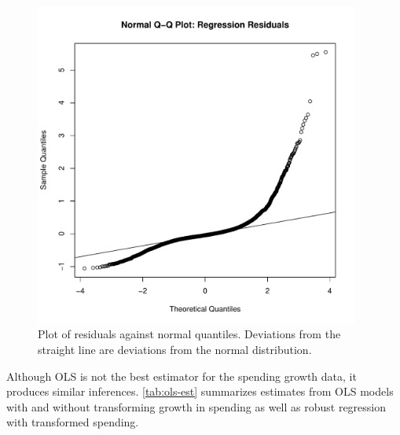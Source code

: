 \documentclass[12pt]{article}
\begin{document}
\begin{figure}[htbp]
	\centering
		\includegraphics[width=0.95\textwidth]{res-qq-plot.pdf}
	\caption{Plot of residuals against normal quantiles. Deviations from the straight line are deviations from the normal distribution.}
	\label{fig:res-qq-plot}
\end{figure}



Although OLS is not the best estimator for the spending growth data, it produces similar inferences.
\autoref{tab:ols-est} summarizes estimates from OLS models with and without transforming growth in spending as well as robust regression with transformed spending. 
\end{document}
